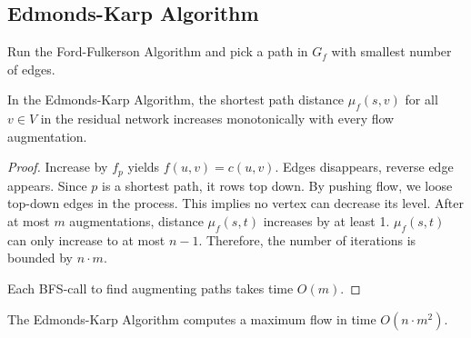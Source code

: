 \subsection{Edmonds-Karp Algorithm}

Run the Ford-Fulkerson Algorithm and pick a path in $G_f$ with smallest number of edges.

\begin{mylemma}
In the Edmonds-Karp Algorithm, the shortest path distance $\mu_f(s,v)$ for all $v \in V$ in the residual network increases monotonically with every flow augmentation.
\end{mylemma}
\begin{proof}
Increase by $f_p$ yields $f(u,v) = c(u,v)$. Edges disappears, reverse edge appears.
Since $p$ is a shortest path, it rows top down. By pushing flow, we loose top-down edges in the process. This implies no vertex can decrease its level. After at most $m$ augmentations, distance $\mu_f (s,t)$ increases by at least 1. $\mu_f(s,t)$ can only increase to at most $n-1$. Therefore, the number of iterations is bounded by $n \cdot m$.

Each BFS-call to find augmenting paths takes time $O(m)$.
\end{proof}

\begin{mylemma}
The Edmonds-Karp Algorithm computes a maximum flow in time $O(n\cdot m^2)$.
\end{mylemma}
